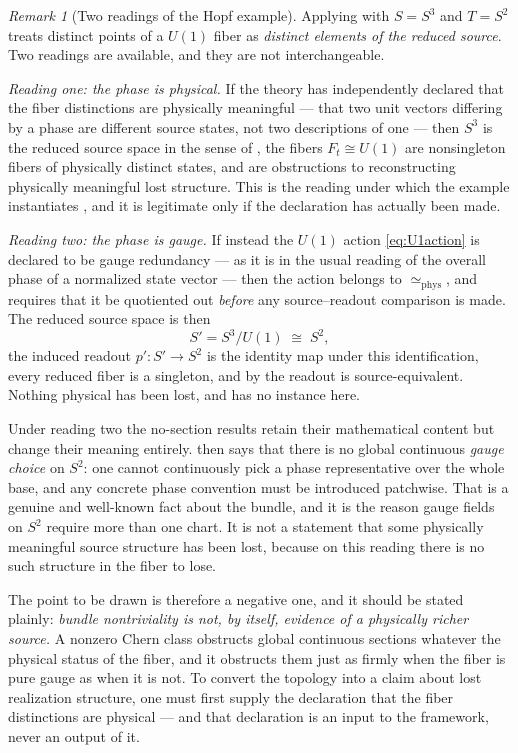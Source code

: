 \documentclass[11pt,reqno]{amsart}
\theoremstyle{plain}
\theoremstyle{definition}
\theoremstyle{remark}
\newtheorem{remark}[theorem]{Remark}
\newcommand{\phe}{\simeq_{\mathrm{phys}}}
\begin{document}
\begin{remark}[Two readings of the Hopf example]
\label{rem:hopfgauge}
Applying  with $S=S^{3}$ and $T=S^{2}$ treats distinct points of a $U(1)$ fiber as \emph{distinct elements of the reduced source}. Two readings are available, and they are not interchangeable.

\emph{Reading one: the phase is physical.} If the theory has independently declared that the fiber distinctions are physically meaningful --- that two unit vectors differing by a phase are different source states, not two descriptions of one --- then $S^{3}$ is the reduced source space in the sense of , the fibers $F_{t}\cong U(1)$ are nonsingleton fibers of physically distinct states, and  are obstructions to reconstructing physically meaningful lost structure. This is the reading under which the example instantiates , and it is legitimate only if the declaration has actually been made.

\emph{Reading two: the phase is gauge.} If instead the $U(1)$ action \eqref{eq:U1action} is declared to be gauge redundancy --- as it is in the usual reading of the overall phase of a normalized state vector --- then the action belongs to $\phe$, and  requires that it be quotiented out \emph{before} any source--readout comparison is made. The reduced source space is then
\[
S'=S^{3}/U(1)\;\cong\;S^{2},
\]
the induced readout $p'\colon S'\to S^{2}$ is the identity map under this identification, every reduced fiber is a singleton, and by  the readout is source-equivalent. Nothing physical has been lost, and  has no instance here.

Under reading two the no-section results retain their mathematical content but change their meaning entirely.  then says that there is no global continuous \emph{gauge choice} on $S^{2}$: one cannot continuously pick a phase representative over the whole base, and any concrete phase convention must be introduced patchwise. That is a genuine and well-known fact about the bundle, and it is the reason gauge fields on $S^{2}$ require more than one chart. It is not a statement that some physically meaningful source structure has been lost, because on this reading there is no such structure in the fiber to lose.

The point to be drawn is therefore a negative one, and it should be stated plainly: \emph{bundle nontriviality is not, by itself, evidence of a physically richer source.} A nonzero Chern class obstructs global continuous sections whatever the physical status of the fiber, and it obstructs them just as firmly when the fiber is pure gauge as when it is not. To convert the topology into a claim about lost realization structure, one must first supply the declaration that the fiber distinctions are physical --- and that declaration is an input to the framework, never an output of it.
\end{remark}
\end{document}
